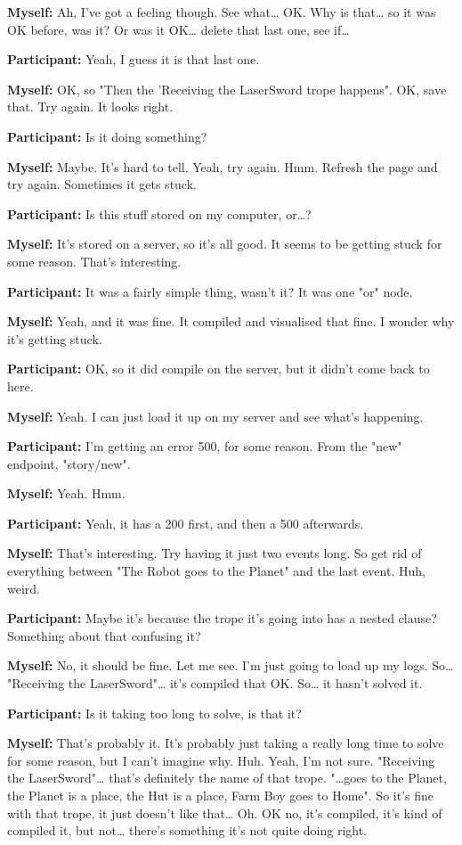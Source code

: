 \documentclass[11pt]{report}
\begin{document}
\begin{linenumbers}
\textbf{Myself:} Ah, I've got a feeling though. See what\ldots{} OK. Why is that\ldots{} so it was OK before, was it? Or was it OK\ldots{} delete that last one, see if\ldots{}

\textbf{Participant:} Yeah, I guess it is that last one.

\textbf{Myself:} OK, so "Then the 'Receiving the LaserSword trope happens". OK, save that. Try again. It looks right.

\textbf{Participant:} Is it doing something?

\textbf{Myself:} Maybe. It's hard to tell. Yeah, try again. Hmm. Refresh the page and try again. Sometimes it gets stuck.

\textbf{Participant:} Is this stuff stored on my computer, or\ldots{}?

\textbf{Myself:} It's stored on a server, so it's all good. It seems to be getting stuck for some reason. That's interesting.

\textbf{Participant:} It was a fairly simple thing, wasn't it? It was one "or" node.

\textbf{Myself:} Yeah, and it was fine. It compiled and visualised that fine. I wonder why it's getting stuck.

\textbf{Participant:} OK, so it did compile on the server, but it didn't come back to here.

\textbf{Myself:} Yeah. I can just load it up on my server and see what's happening.

\textbf{Participant:} I'm getting an error 500, for some reason. From the "new" endpoint, "story/new".

\textbf{Myself:} Yeah. Hmm.

\textbf{Participant:} Yeah, it has a 200 first, and then a 500 afterwards.

\textbf{Myself:} That's interesting. Try having it just two events long. So get rid of everything between "The Robot goes to the Planet" and the last event. Huh, weird.

\textbf{Participant:} Maybe it's because the trope it's going into has a nested clause? Something about that confusing it?

\textbf{Myself:} No, it should be fine. Let me see. I'm just going to load up my logs. So\ldots{} "Receiving the LaserSword"\ldots{} it's compiled that OK. So\ldots{} it hasn't solved it.

\textbf{Participant:} Is it taking too long to solve, is that it?

\textbf{Myself:} That's probably it. It's probably just taking a really long time to solve for some reason, but I can't imagine why. Huh. Yeah, I'm not sure. "Receiving the LaserSword"\ldots{} that's definitely the name of that trope. "\ldots{}goes to the Planet, the Planet is a place, the Hut is a place, Farm Boy goes to Home". So it's fine with that trope, it just doesn't like that\ldots{} Oh. OK no, it's compiled, it's kind of compiled it, but not\ldots{} there's something it's not quite doing right.


\end{linenumbers}
\end{document}
